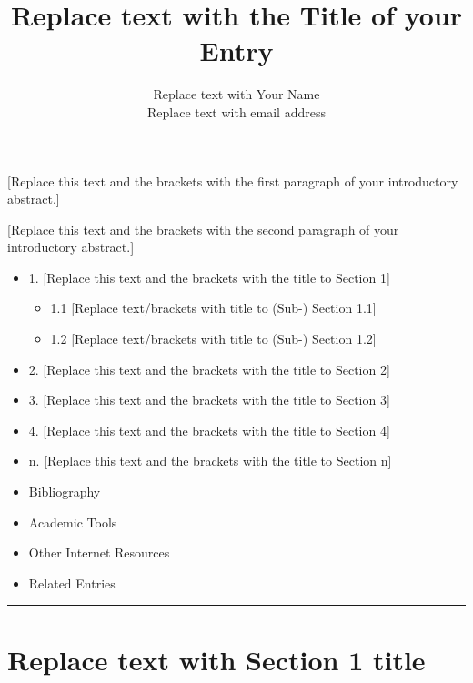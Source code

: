 \documentclass{article}
\title{Replace text with the Title of your Entry}
\author{Replace text with Your Name   \\
  Replace text with email address   }
\date{}
\begin{document}
\maketitle

[Replace this text and the brackets with the first paragraph
of your introductory abstract.]

[Replace this text and the brackets with the second paragraph
of your introductory abstract.]

%
\begin{itemize}

\item 1. [Replace this text and the brackets with the title to Section 1]
 
 \begin{itemize}
 \item 1.1 [Replace text/brackets with title to (Sub-) Section 1.1]
 \item 1.2 [Replace text/brackets with title to (Sub-) Section 1.2]
 \end{itemize}

\item 2. [Replace this text and the brackets with the title to Section 2]

\item 3. [Replace this text and the brackets with the title to Section 3]

\item 4. [Replace this text and the brackets with the title to Section 4]

\item n. [Replace this text and the brackets with the title to Section n]

\item Bibliography

\item Academic Tools

\item Other Internet Resources

\item Related Entries

\end{itemize}

\hrule 



\section{Replace text with Section 1 title}
\end{document}
